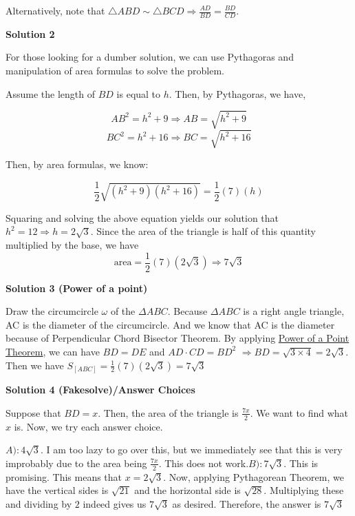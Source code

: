 \begin{enumerate}
 Alternatively, note that $\triangle ABD \sim \triangle BCD \Longrightarrow \frac{AD}{BD} = \frac{BD}{CD}$.

 



\textbf{Solution 2}

For those looking for a dumber solution, we can use Pythagoras and manipulation of area formulas to solve the problem.

 Assume the length of $BD$ is equal to $h$. Then, by Pythagoras, we have, 

 
 \[AB^2 = h^2 + 9 \Rightarrow AB = \sqrt{h^2 + 9}\]
 \[BC^2 = h^2 + 16 \Rightarrow BC = \sqrt{h^2 + 16}\]

 Then, by area formulas, we know:

 
 \[\frac{1}{2}\sqrt{(h^2+9)(h^2+16)} = \frac{1}{2}(7)(h)\]

 Squaring and solving the above equation yields our solution that $h^2 = 12 \Rightarrow h = 2\sqrt{3}.$ Since the area of the triangle is half of this quantity multiplied by the base, we have 
 \[\text{area}  = \frac{1}{2}(7)(2\sqrt{3})\Rightarrow \boxed{7\sqrt{3}}\]




\textbf{Solution 3 (Power of a point)}

Draw the circumcircle $\omega$ of the $\Delta ABC$. Because $\Delta ABC$ is a right angle triangle, AC is the diameter of the circumcircle. And we know that AC is the diameter because of Perpendicular Chord Bisector Theorem. By applying \href{https://artofproblemsolving.com/wiki/index.php?title=Power\_of\_a\_Point\_Theorem}{Power of a Point Theorem}, we can have $BD=DE$ and $AD\cdot CD=BD^2$ $\Rightarrow BD=\sqrt{3\times 4}=2\sqrt{3}$. Then we have $S_{[ABC]}=\frac{1}{2}(7)(2\sqrt{3})=\boxed{7\sqrt{3}}$




\textbf{Solution 4 (Fakesolve)/Answer Choices}

Suppose that $BD=x$. Then, the area of the triangle is $\frac{7x}{2}$. We want to find what $x$ is. Now, we try each answer choice. 

 $A): 4 \sqrt{3}$. I am too lazy to go over this, but we immediately see that this is very improbably due to the area being $\frac{7x}{2}$. This does not work.$B): 7 \sqrt{3}$. This is promising. This means that $x = 2\sqrt{3}$. Now, applying Pythagorean Theorem, we have the vertical sides is $\sqrt {21}$ and the horizontal side is $\sqrt {28}$. Multiplying these and dividing by $2$ indeed gives us $7 \sqrt {3}$ as desired. Therefore, the answer is $\boxed{7 \sqrt{3}}$





\end{enumerate}

